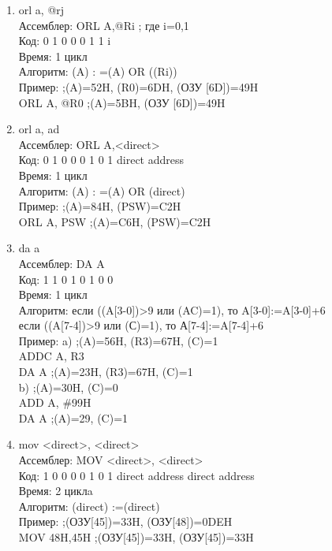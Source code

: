 \begin{enumerate}
\item orl a, @rj \\
Ассемблер: 	ORL A,@Ri ; где i=0,1 \\
Код: 		0 1 0 0 0 1 1 i \\
Время: 		1 цикл \\
Алгоритм: 	(A) : =(A) OR ((Ri)) \\
Пример: 			;(A)=52H,  (R0)=6DH, (ОЗУ [6D])=49H \\
		ORL A, @R0	;(A)=5BH, (ОЗУ [6D])=49H \\

\item orl a, ad \\
Ассемблер: 	ORL A,<direct> \\
Код: 		0 1 0 0 0 1 0 1 direct address \\
Время: 		1 цикл \\
Алгоритм: 	(A) : =(A) OR (direct) \\
Пример: 			;(A)=84H, (PSW)=C2H \\
		ORL A, PSW	;(A)=C6H, (PSW)=C2H \\

\item da a \\
Ассемблер: 	DA A \\
Код: 		1 1 0 1 0 1 0 0 \\
Время: 		1 цикл \\
Алгоритм: 	если ((A[3-0])>9 или (AC)=1), то A[3-0]:=A[3-0]+6 \\
		    если ((A[7-4])>9 или (С)=1), то А[7-4]:=A[7-4]+6 \\
Пример: 	a) 		;(A)=56H, (R3)=67H, (C)=1 \\
		ADDC A, R3 \\
		DA A		;(A)=23H, (R3)=67H, (C)=1 \\
		b) 		;(A)=30H, (C)=0 \\
		ADD A, \#99H \\
		DA A		;(A)=29, (C)=1 \\

\item mov <direct>, <direct> \\
Ассемблер: 	MOV <direct>, <direct> \\
Код:    1 0 0 0 0 1 0 1 direct address direct address \\
Время: 	2 циклa \\
Алгоритм: 	(direct) :=(direct) \\
Пример:             ;(ОЗУ[45])=33H, (ОЗУ[48])=0DEH \\
        MOV 48H,45H ;(ОЗУ[45])=33H, (ОЗУ[45])=33H \\


\end{enumerate}
